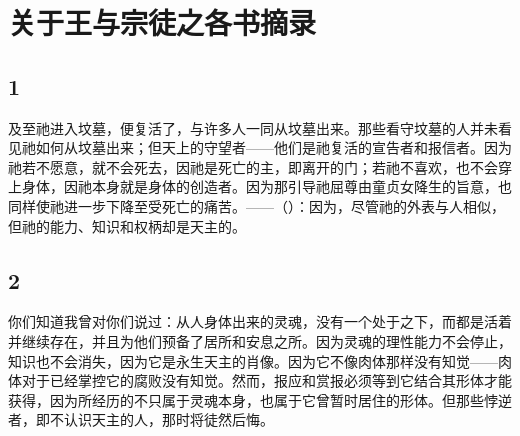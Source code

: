 
\chapter{关于王与宗徒之各书摘录}



\section{1}

\par

及至祂进入坟墓，便复活了，与许多人一同从坟墓出来。那些看守坟墓的人并未看见祂如何从坟墓出来；但天上的守望者——他们是祂复活的宣告者和报信者。因为祂若不愿意，就不会死去，因祂是死亡的主，即离开的门；若祂不喜欢，也不会穿上身体，因祂本身就是身体的创造者。因为那引导祂屈尊由童贞女降生的旨意，也同样使祂进一步下降至受死亡的痛苦。——（）：因为，尽管祂的外表与人相似，但祂的能力、知识和权柄却是天主的。\par


\section{2}

\par

你们知道我曾对你们说过：从人身体出来的灵魂，没有一个处于之下，而都是活着并继续存在，并且为他们预备了居所和安息之所。因为灵魂的理性能力不会停止，知识也不会消失，因为它是永生天主的肖像。因为它不像肉体那样没有知觉——肉体对于已经掌控它的腐败没有知觉。然而，报应和赏报必须等到它结合其形体才能获得，因为所经历的不只属于灵魂本身，也属于它曾暂时居住的形体。但那些悖逆者，即不认识天主的人，那时将徒然后悔。\par


